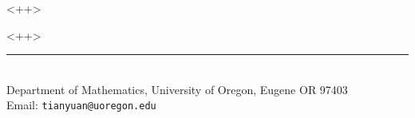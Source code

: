 \documentclass[a4paper]{amsart}
\begin{document}
\begin{center}
\large\textsc{ <++>}\\
\end{center}

<++>

%
% 

\begin{center}
\noindent\rule{4cm}{.5pt}
\vspace{.25cm}

\\
{\small Department of Mathematics, University of Oregon, Eugene OR 97403} \\
Email: {\tt {tianyuan@uoregon.edu}}
\end{center}
\end{document}
